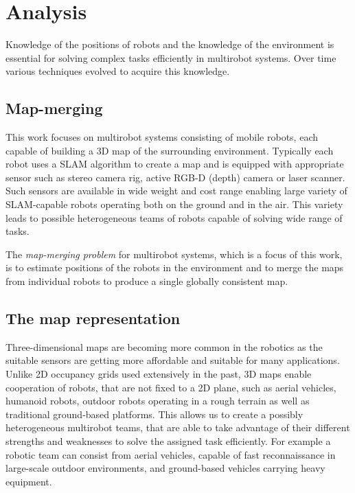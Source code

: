 \chapter{Analysis}
\label{chap:analysis}

Knowledge of the positions of robots and the knowledge of the environment is essential for solving complex tasks efficiently in multirobot systems. Over time various techniques evolved to acquire this knowledge.

\section{Map-merging}

This work focuses on multirobot systems consisting of mobile robots, each capable of building a 3D map of the surrounding environment. Typically each robot uses a \gls{SLAM} algorithm to create a map and is equipped with appropriate sensor such as stereo camera rig, active RGB-D (depth) camera or laser scanner. Such sensors are available in wide weight and cost range enabling large variety of \gls{SLAM}-capable robots operating both on the ground and in the air. This variety leads to possible heterogeneous teams of robots capable of solving wide range of tasks.

The \textit{map-merging problem} for multirobot systems, which is a focus of this work, is to estimate positions of the robots in the environment and to merge the maps from individual robots to produce a single globally consistent map.

\section{The map representation}

Three-dimensional maps are becoming more common in the robotics as the suitable sensors are getting more affordable and suitable for many applications. Unlike 2D occupancy grids used extensively in the past, 3D maps enable cooperation of robots, that are not fixed to a 2D plane, such as aerial vehicles, humanoid robots, outdoor robots operating in a rough terrain as well as traditional ground-based platforms. This allows us to create a possibly heterogeneous multirobot teams, that are able to take advantage of their different strengths and weaknesses to solve the assigned task efficiently. For example a robotic team can consist from aerial vehicles, capable of fast reconnaissance in large-scale outdoor environments, and ground-based vehicles carrying heavy equipment.

